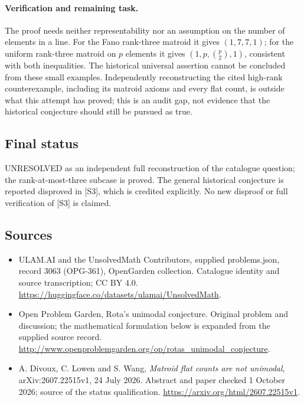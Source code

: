 \documentclass[11pt,a4paper]{article}
\begin{document}
\paragraph{Verification and remaining task.}
The proof needs neither representability nor an assumption on the
number of elements in a line. For the Fano rank-three matroid it gives
$(1,7,7,1)$; for the uniform rank-three matroid on $p$ elements it
gives $(1,p,\binom p2,1)$, consistent with both inequalities. The
historical universal assertion cannot be concluded from these small
examples. Independently reconstructing the cited high-rank counterexample,
including its matroid axioms and every flat count, is outside what this
attempt has proved; this is an audit gap, not evidence that the
historical conjecture should still be pursued as true.

\subsection{Final status}
UNRESOLVED as an independent full reconstruction of the catalogue
question; the rank-at-most-three subcase is proved. The general
historical conjecture is reported disproved in [S3], which is credited
explicitly. No new disproof or full verification of [S3] is claimed.

\subsection{Sources}
\begin{itemize}
\item[S1] ULAM.AI and the UnsolvedMath Contributors, supplied problems.json, record 3063 (OPG-361), OpenGarden collection. Catalogue identity and source transcription; CC BY 4.0.
\url{https://huggingface.co/datasets/ulamai/UnsolvedMath}.
\item[S2] Open Problem Garden, Rota's unimodal conjecture. Original problem and discussion; the mathematical formulation below is expanded from the supplied source record.
\url{http://www.openproblemgarden.org/op/rotas_unimodal_conjecture}.
\item[S3] A. Divoux, C. Lowen and S. Wang, \emph{Matroid flat counts are not unimodal}, arXiv:2607.22515v1, 24 July 2026. Abstract and paper checked 1 October 2026; source of the status qualification.
\url{https://arxiv.org/html/2607.22515v1}.
\end{itemize}
\end{document}
